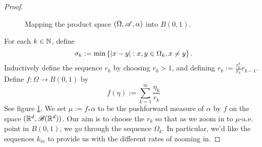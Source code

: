 \begin{proof}
\begin{figure}
        \caption{Mapping the product space $(\Omega,\mathscr{A},\alpha)$ into $B(0,1)$.}
        \label{fig:oneilPushforwardMap}
    \end{figure}
     
    For each $k \in \mathbb{N}$, define 
    \begin{equation}
        \sigma_k := \min\left\{ { \left\vert {x - y} \right\vert : x,y \in \Omega_k, x \neq y } \right\}.
    \end{equation}
    Inductively define the sequence $r_k$ by choosing $r_0 > 1$, and defining $r_k := \frac{r_0^{k}}{\sigma_k} r_{k-1}$.
    Define $f \colon \Omega \to B(0,1)$ by
    \begin{equation}
        f(\eta) := \sum_{k=1}^\infty \frac{\eta_k}{r_k}
    \end{equation}
    See figure \ref{fig:oneilPushforwardMap}. We set $\mu := f_* \alpha$ to be the pushforward measure of $\alpha$ by $f$ on the space $(\mathbb{R}^d, \mathscr{B}(\mathbb{R}^d))$. Our aim is to choose the $r_k$ so that as we zoom in to $\mu$-a.e. point in $B(0,1)$, we go through the sequence $\Omega_k$. In particular, we'd like the sequences $k_m$ to provide us with the different rates of zooming in.


\end{proof}

